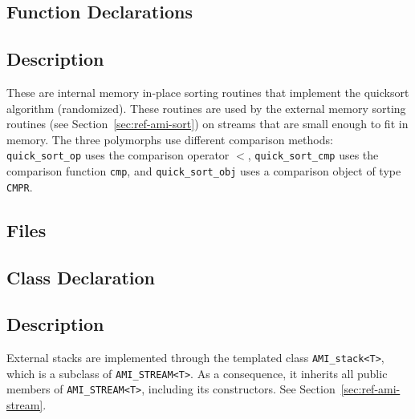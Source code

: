 \subsection{Function Declarations}

  \btabb
      {}

      {}

      {}
  \etabb

\subsection{Description}

These are internal memory in-place sorting routines that implement the
quicksort algorithm (randomized).  These routines are used by the external
memory sorting routines (see Section~\ref{sec:ref-ami-sort}) on streams
that are small enough to fit in memory.
The three polymorphs use different comparison methods:
\lstinline|quick_sort_op| uses the comparison operator $<$,
\lstinline|quick_sort_cmp| uses the comparison function \lstinline|cmp|, and
\lstinline|quick_sort_obj| uses a comparison object of type \lstinline|CMPR|.


\subsection{Files}
  \btabb
         {}
  \etabb

\subsection{Class Declaration}
   \btabb
         {}
   \etabb

\subsection{Description}
External stacks are implemented through the templated class
\lstinline|AMI_stack<T>|, 
which is a subclass of \lstinline|AMI_STREAM<T>|. As a consequence, it
inherits all public members of \lstinline|AMI_STREAM<T>|, including its
constructors. See Section~\ref{sec:ref-ami-stream}.

